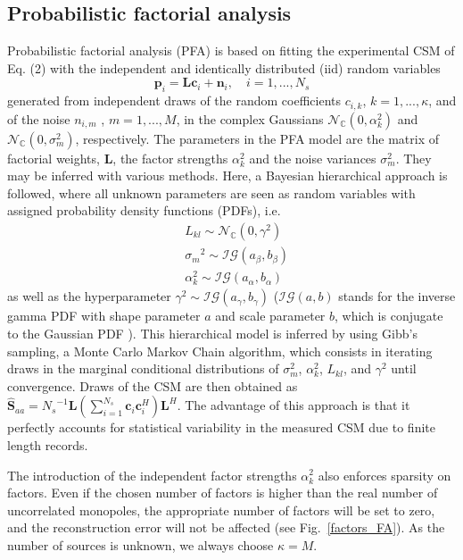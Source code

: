 \documentclass[fontsize=12pt,DIV13,paper=a4,abstract=true,titlepage=false]{scrartcl}
\begin{document}
\subsection{Probabilistic factorial analysis}
Probabilistic factorial analysis (PFA) is based on fitting the experimental CSM of Eq. (2) with the independent and identically distributed (iid) random variables  
\begin{equation}
        \bm{p}_i = \bm{L}\bm{c}_i +\bm{n}_i, \quad i=1,...,{N_s}
\end{equation}
generated from independent draws of the random coefficients $c_{i,k}$, $k=1,...,\kappa$, and of the noise $n_{i,m}$ , $m=1,...,M$, in the complex Gaussians $\mathcal{N}_{\mathbb{C}} \left(0,\alpha_k^2 \right) $ and $\mathcal{N}_{\mathbb{C}} \left(0,\sigma_m^2 \right) $, respectively. The parameters in the PFA model are the matrix of factorial weights, $\bm{L}$, the factor strengths $\alpha_k^2$ and the noise variances $\sigma_m^2$. They may be inferred with various methods. Here, a Bayesian hierarchical approach is followed, where all unknown parameters are seen as random variables with assigned probability density functions (PDFs), i.e.
\begin{align*}
	&{L_{kl}}\sim \mathcal{N}_{\mathbb{C}}(0,\gamma^2)\\
    &{\sigma_{m}}^2\sim \mathcal{IG}(a_{\beta},b_{\beta})\\
    &{\alpha_k^2}\sim \mathcal{IG}(a_{\alpha},b_{\alpha})
\end{align*}
as well as the hyperparameter ${\gamma^2}\sim \mathcal{IG}(a_{\gamma},b_{\gamma})$ ($\mathcal{IG}(a,b)$ stands for the inverse gamma PDF with shape parameter $a$ and scale parameter $b$, which is conjugate to the Gaussian PDF \cite{Gamerman2006}). This hierarchical model is inferred by using Gibb's sampling, a Monte Carlo Markov Chain algorithm, which consists in iterating draws in the marginal conditional distributions of $\sigma_m^2$, $\alpha_k^2$, $L_{kl}$, and $\gamma^2$ until convergence. Draws of the CSM are then obtained as $\bm{\hat{S}}_{aa}={N_s}^{-1}\bm{L}( \sum_{i=1}^{N_s}\bm{c}_i\bm{c}^H_i) \bm{L}^H$. The advantage of this approach is that it perfectly accounts for statistical variability in the measured CSM due to finite length records.  

The introduction of the independent factor strengths $\alpha_k^2$ also enforces sparsity on factors. Even if the chosen number of factors is higher than the real number of uncorrelated monopoles, the appropriate number of factors will be set to zero, and the reconstruction error will not be affected (see Fig.~\ref{factors_FA}). As the number of sources is unknown, we always choose $\kappa=M$. 
\end{document}
